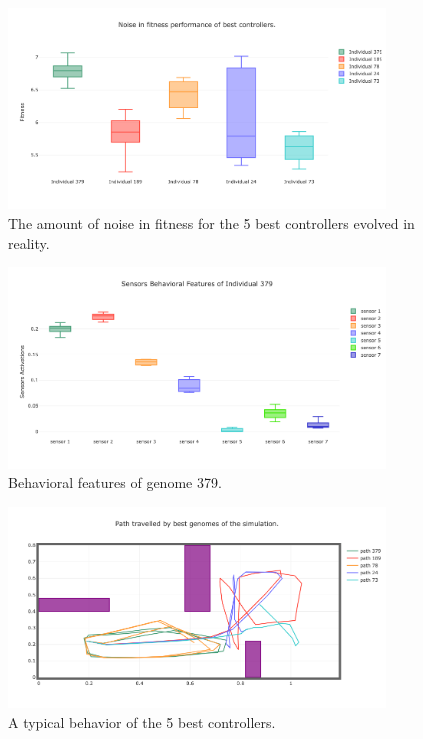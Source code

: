 \begin{figure}[H]
    \centering
    \includegraphics[width=10cm]{include/images/thymio_fitness_noise.PNG}
    \caption{The amount of noise in fitness for the 5 best controllers evolved in reality.}
    \label{fig:thymio_fitness_noise}
\end{figure}

\begin{figure}[H]
    \centering
    \includegraphics[width=10cm]{include/images/thymio_379_sensors.PNG}
    \caption{Behavioral features of genome 379.}
    \label{fig:thymio_best_behavioral_features}
\end{figure}

\begin{figure}[H]
    \centering
    \includegraphics[width=10cm]{include/images/reality_path_traveled.PNG}
    \caption{A typical behavior of the 5 best controllers.}
    \label{fig:path_traveled_thymio_reality_based}
\end{figure}


